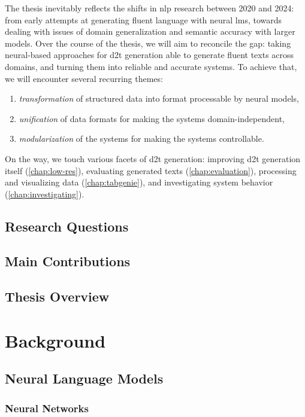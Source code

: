 \documentclass[12pt,notitlepage,a4paper,openright]{report}
\begin{document}
The thesis inevitably reflects the shifts in \ac{nlp} research between 2020 and 2024: from early attempts at generating fluent language with neural \acp{lm}, towards dealing with issues of domain generalization and semantic accuracy with larger models.
Over the course of the thesis, we will aim to reconcile the gap: taking neural-based approaches for \ac{d2t} generation able to generate fluent texts across domains, and turning them into reliable and accurate systems. To achieve that, we will encounter several recurring themes:
\begin{enumerate}
  \item \textit{transformation} of structured data into format processable by neural models,
  \item \textit{unification} of data formats for making the systems domain-independent,
  \item \textit{modularization} of the systems for making the systems controllable.
\end{enumerate}
On the way, we touch various facets of \ac{d2t} generation: improving \ac{d2t} generation itself (\autoref{chap:low-res}), evaluating generated texts (\autoref{chap:evaluation}), processing and visualizing data (\autoref{chap:tabgenie}), and investigating system behavior (\autoref{chap:investigating}).


\section{Research Questions}
\label{sec:rq}
\section{Main Contributions}
\label{sec:contributions}
\section{Thesis Overview}
\label{sec:overview}

\chapter{Background}
\label{chap:background}
\section{Neural Language Models}
\label{sec:lms}
\subsection{Neural Networks}
\label{sec:nns}
\end{document}
